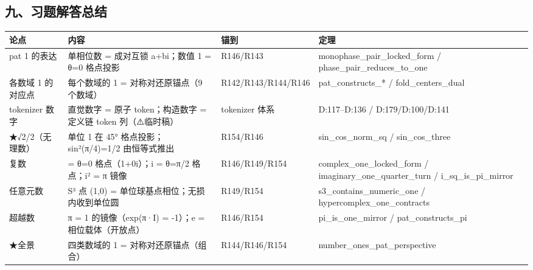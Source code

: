 \documentclass[
]{article}
\newcounter{none} %
\begin{document}
\subsection{九、习题解答总结}\label{ux4e5dux4e60ux9898ux89e3ux7b54ux603bux7ed3}

{\def\LTcaptype{none} %
\begin{longtable}[]{@{}
 >{\raggedright\arraybackslash}p{}
 >{\raggedright\arraybackslash}p{}
 >{\raggedright\arraybackslash}p{}
 >{\raggedright\arraybackslash}p{}@{}}
\toprule\noalign{}
\begin{minipage}[b]{\linewidth}\raggedright
论点
\end{minipage} & \begin{minipage}[b]{\linewidth}\raggedright
内容
\end{minipage} & \begin{minipage}[b]{\linewidth}\raggedright
锚到
\end{minipage} & \begin{minipage}[b]{\linewidth}\raggedright
定理
\end{minipage} \\
\midrule\noalign{}
\endhead
\bottomrule\noalign{}
\endlastfoot
pat 1 的表达 & 单相位数 = 成对互锁 a+bi；数值 1 = θ=0 格点投影 &
R146/R143 & monophase\_pair\_locked\_form /
phase\_pair\_reduces\_to\_one \\
各数域 1 的对应点 & 每个数域的 1 = 对称对还原锚点（9 个数域） &
R142/R143/R144/R146 & pat\_constructs\_* / fold\_centers\_dual \\
tokenizer 数字 & 直觉数字 = 原子 token；构造数字 = 定义链 token
列（⚠️临时稿） & tokenizer 体系 & D:117--D:136 / D:179/D:100/D:141 \\
★√2/2（无理数） & 单位 1 在 45° 格点投影；sin²(π/4)=1/2 由恒等式推出 &
R154/R146 & sin\_cos\_norm\_sq / sin\_cos\_three \\
复数 & 1 = θ=0 格点（1+0i）；i = θ=π/2 格点；i² = π 镜像 &
R146/R149/R154 & complex\_one\_locked\_form /
imaginary\_one\_quarter\_turn / i\_sq\_is\_pi\_mirror \\
任意元数 & S³ 点 (1,0) = 单位球基点相位；无损内收到单位圆 & R149/R154 &
s3\_contains\_numeric\_one / hypercomplex\_one\_contracts \\
超越数 & π = 1 的镜像（exp(π·I) = -1）；e = 相位载体（开放点） &
R146/R154 & pi\_is\_one\_mirror / pat\_constructs\_pi \\
★全景 & 四类数域的 1 = 对称对还原锚点（组合） & R144/R146/R154 &
number\_ones\_pat\_perspective \\
\end{longtable}
}
\end{document}
